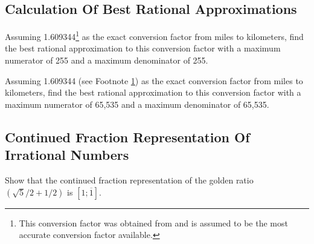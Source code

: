 \subsection{Calculation Of Best Rational Approximations}

\begin{vworkexercisestatement}
\label{exe:cfr0:sexe0:b01}
Assuming 1.609344\footnote{\label{footnote:exe:cfr0:sexe0:b01}This 
conversion factor was
obtained from \cite{bibref:b:nistsp811:1995ed} and is
assumed to be the most accurate conversion factor available.} 
as the exact conversion factor from miles to
kilometers, find the best rational approximation to this
conversion factor with a maximum numerator of 255 and a maximum
denominator of 255.
\end{vworkexercisestatement}

\begin{vworkexercisestatement}
\label{exe:cfr0:sexe0:b02}
Assuming 1.609344 (see Footnote \ref{footnote:exe:cfr0:sexe0:b01})
as the exact conversion factor from miles to
kilometers, find the best rational approximation to this
conversion factor with a maximum numerator of 65,535 and a maximum
denominator of 65,535.
\end{vworkexercisestatement}

\subsection{Continued Fraction Representation Of Irrational Numbers}

\begin{vworkexercisestatement}
\label{exe:cfr0:sexe0:c01}
Show that the continued fraction representation of the 
golden ratio $(\sqrt{5}/2 + 1/2)$ is $[1;\overline{1}]$.
\end{vworkexercisestatement}

\vworkexercisefooter{}


